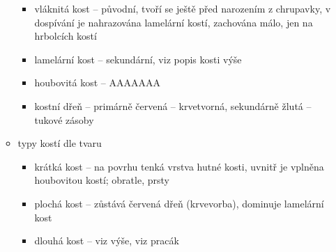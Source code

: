 \documentclass{article}
\begin{document}
\begin{itemize}
\begin{itemize}
\begin{itemize}
      \item vláknitá kost -- původní, tvoří se ještě před narozením z chrupavky, v dospívání je nahrazována lamelární kostí, zachována málo, jen na hrbolcích kostí
      \item lamelární kost -- sekundární, viz popis kosti výše
      \item houbovitá kost -- AAAAAAA
      \item kostní dřeň -- primárně červená -- krvetvorná, sekundárně žlutá -- tukové zásoby
    \end{itemize}
    \item typy kostí dle tvaru
    \begin{itemize}
      \item krátká kost -- na povrhu tenká vrstva hutné kosti, uvnitř je vplněna houbovitou kostí; obratle, prsty
      \item plochá kost -- zůstává červená dřeň (krvevorba), dominuje lamelární kost
      \item dlouhá kost -- viz výše, viz pracák
    \end{itemize}
  \end{itemize}
\end{itemize}
\end{document}
